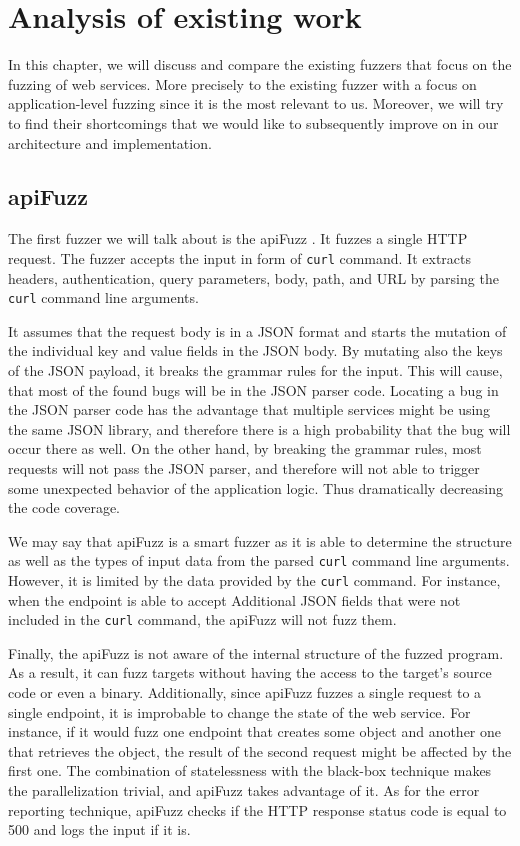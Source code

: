 \chapter{Analysis of existing work}
In this chapter, we will discuss and compare the existing fuzzers that focus on the fuzzing of web services. More precisely to the existing fuzzer with a focus on application-level fuzzing since it is the most relevant to us. \label{sub:Types of fuzzers} Moreover, we will try to find their shortcomings that we would like to subsequently improve on in our architecture and implementation.

\section{apiFuzz}
The first fuzzer we will talk about is the apiFuzz \cite{apiFuzz2020github}. It fuzzes a single HTTP request. The fuzzer accepts the input in form of \texttt{curl} command. It extracts headers, authentication, query parameters, body, path, and URL by parsing the \texttt{curl} command line arguments.

It assumes that the request body is in a JSON format and starts the mutation of the individual key and value fields in the JSON body. By mutating also the keys of the JSON payload, it breaks the grammar rules for the input. This will cause, that most of the found bugs will be in the JSON parser code. Locating a bug in the JSON parser code has the advantage that multiple services might be using the same JSON library, and therefore there is a high probability that the bug will occur there as well. On the other hand, by breaking the grammar rules, most requests will not pass the JSON parser, and therefore will not able to trigger some unexpected behavior of the application logic. Thus dramatically decreasing the code coverage.

We may say that apiFuzz is a smart fuzzer as it is able to determine the structure as well as the types of input data from the parsed \texttt{curl} command line arguments. However, it is limited by the data provided by the \texttt{curl} command. For instance, when the endpoint is able to accept Additional JSON fields that were not included in the \texttt{curl} command, the apiFuzz will not fuzz them.

Finally, the apiFuzz is not aware of the internal structure of the fuzzed program. As a result, it can fuzz targets without having the access to the target's source code or even a binary. Additionally, since apiFuzz fuzzes a single request to a single endpoint, it is improbable to change the state of the web service. For instance, if it would fuzz one endpoint that creates some object and another one that retrieves the object, the result of the second request might be affected by the first one. The combination of statelessness with the black-box technique makes the parallelization trivial, and apiFuzz takes advantage of it. As for the error reporting technique, apiFuzz checks if the HTTP response status code is equal to 500 and logs the input if it is.

